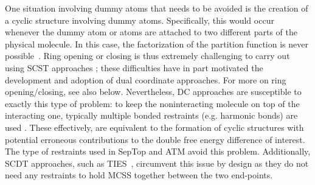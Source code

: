 \documentclass[9pt,bestpractices]{livecoms}
\begin{document}
One situation involving dummy atoms that needs to be avoided is the creation of a cyclic structure involving dummy atoms.  Specifically, this would occur whenever the dummy atom or atoms are attached to two different parts of the physical molecule. In this case, the factorization of the partition function is never possible~\cite{Shobana_2000}. Ring opening or closing is thus extremely challenging to carry out using SCST approaches \cite{liu2015ring}; these difficulties have in part motivated the development and adoption of dual coordinate approaches. For more on ring opening/closing, see also below. Nevertheless, DC approaches are susceptible to exactly this type of problem: to keep the noninteracting molecule on top of the interacting one, typically multiple bonded restraints (e.g. harmonic bonds) are used \cite{Axelsen_1998,Ries_2022}. These effectively, are equivalent to the formation of cyclic structures with potential erroneous contributions to the double free energy difference of interest. The type of restraints used in SepTop \cite{rocklin2013separated,Baumann_2023} and ATM \cite{azimi2022relative} avoid this problem.
Additionally, SCDT approaches, such as TIES~\cite{bhati2017}, circumvent this issue by design as they do not need any restraints to hold MCSS together between the two end-points.
\end{document}
